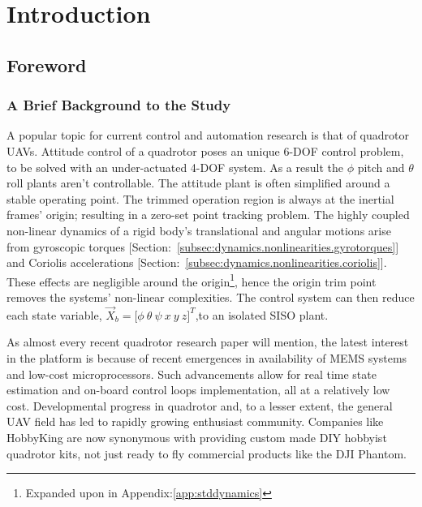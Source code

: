 \chapter{Introduction}
\label{ch:intro}
\section{Foreword}
\label{sec:intro.foreword}
\subsection{A Brief Background to the Study}
\label{subsec:intro.foreword.background}
A popular topic for current control and automation research is that of quadrotor UAVs. Attitude control of a quadrotor poses an unique 6-DOF control problem, to be solved with an under-actuated 4-DOF system. As a result the $\phi$ pitch and $\theta$ roll plants aren't controllable. The attitude plant is often simplified around a stable operating point. The trimmed operation region is always at the inertial frames' origin; resulting in a zero-set point tracking problem. The highly coupled non-linear dynamics of a rigid body's translational and angular motions arise from gyroscopic torques [Section:~\ref{subsec:dynamics.nonlinearities.gyrotorques}] and Coriolis accelerations [Section:~\ref{subsec:dynamics.nonlinearities.coriolis}]. These effects are negligible around the origin\footnote{Expanded upon in Appendix:\ref{app:stddynamics}}, hence the origin trim point removes the systems' non-linear complexities. The control system can then reduce each state variable, $\vec{X}_b=\big[\phi~\theta~\psi~x~y~z\big]^T$,to an isolated SISO plant.
\par
As almost every recent quadrotor research paper will mention, the latest interest in the platform is because of recent emergences in availability of MEMS systems and low-cost microprocessors. Such advancements allow for real time state estimation and on-board control loops implementation, all at a relatively low cost. Developmental progress in quadrotor and, to a lesser extent, the general UAV field has led to rapidly growing enthusiast community. Companies like HobbyKing\cite{hobbyking} are now synonymous with providing custom made DIY hobbyist quadrotor kits, not just ready to fly commercial products like the DJI Phantom\cite{phantom}.
